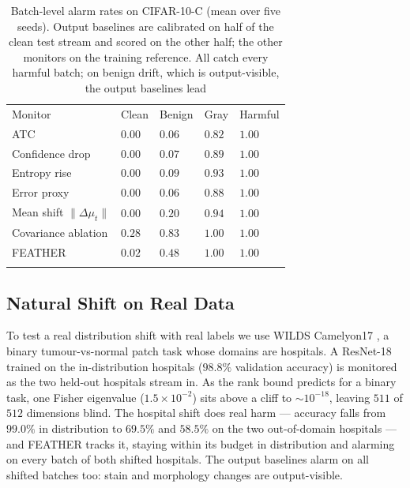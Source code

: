 \documentclass[graybox]{SNmult}
\begin{document}
\begin{table}[!t]
\caption{Batch-level alarm rates on CIFAR-10-C (mean over five seeds). Output
baselines are calibrated on half of the clean test stream and scored on the
other half; the other monitors on the training reference. All catch every
harmful batch; on benign drift, which is output-visible, the output baselines
lead}
\label{tab:alarms}
\begin{tabular}{p{3.3cm}p{1.7cm}p{1.7cm}p{1.7cm}p{1.7cm}}
\hline\noalign{\smallskip}
Monitor & Clean & Benign & Gray & Harmful \\
\noalign{\smallskip}\svhline\noalign{\smallskip}
ATC \cite{garg2022atc} & $0.00$ & $\mathbf{0.06}$ & $0.82$ & $1.00$ \\
Confidence drop & $0.00$ & $0.07$ & $0.89$ & $1.00$ \\
Entropy rise & $0.00$ & $0.09$ & $0.93$ & $1.00$ \\
Error proxy \cite{amoukou2024sequential} & $0.00$ & $\mathbf{0.06}$ & $0.88$ & $1.00$ \\
\noalign{\smallskip}
Mean shift $\lVert\Delta\mu_t\rVert$ & $0.00$ & $0.20$ & $0.94$ & $1.00$ \\
Covariance ablation & $0.28$ & $0.83$ & $1.00$ & $1.00$ \\
FEATHER & $0.02$ & $0.48$ & $1.00$ & $1.00$ \\
\noalign{\smallskip}\hline\noalign{\smallskip}
\end{tabular}
\end{table}

\subsection{Natural Shift on Real Data}
\label{sec:wilds}

 To test a real distribution shift with real labels we use WILDS Camelyon17
\cite{koh2021wilds}, a binary tumour-vs-normal patch task whose domains are
hospitals. A ResNet-18 trained on the in-distribution hospitals ($98.8\%$
validation accuracy) is monitored as the two held-out hospitals stream in. As
the rank bound predicts for a binary task, one Fisher eigenvalue
($1.5\times10^{-2}$) sits above a cliff to $\sim10^{-18}$, leaving $511$ of
$512$ dimensions blind. The hospital shift does real harm --- accuracy falls from $99.0\%$
in distribution to $69.5\%$ and $58.5\%$ on the two out-of-domain hospitals ---
and FEATHER tracks it, staying within its budget in distribution and alarming
on every batch of both shifted hospitals. The output baselines alarm on all
shifted batches too: stain and morphology changes are output-visible.
\end{document}
